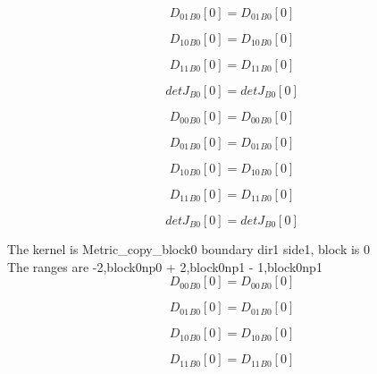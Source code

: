 \documentclass{article}
\begin{document}
\begin{dmath}{D_{01}{_{B0}}}[{0}] = {D_{01}{_{B0}}}[{0}]\end{dmath}

\begin{dmath}{D_{10}{_{B0}}}[{0}] = {D_{10}{_{B0}}}[{0}]\end{dmath}

\begin{dmath}{D_{11}{_{B0}}}[{0}] = {D_{11}{_{B0}}}[{0}]\end{dmath}

\begin{dmath}{detJ{_{B0}}}[{0}] = {detJ{_{B0}}}[{0}]\end{dmath}

\begin{dmath}{D_{00}{_{B0}}}[{0}] = {D_{00}{_{B0}}}[{0}]\end{dmath}

\begin{dmath}{D_{01}{_{B0}}}[{0}] = {D_{01}{_{B0}}}[{0}]\end{dmath}

\begin{dmath}{D_{10}{_{B0}}}[{0}] = {D_{10}{_{B0}}}[{0}]\end{dmath}

\begin{dmath}{D_{11}{_{B0}}}[{0}] = {D_{11}{_{B0}}}[{0}]\end{dmath}

\begin{dmath}{detJ{_{B0}}}[{0}] = {detJ{_{B0}}}[{0}]\end{dmath}

\noindent The kernel is Metric_copy_block0 boundary dir1 side1, block is 0\\\noindent The ranges are -2,block0np0 + 2,block0np1 - 1,block0np1\\\begin{dmath}{D_{00}{_{B0}}}[{0}] = {D_{00}{_{B0}}}[{0}]\end{dmath}

\begin{dmath}{D_{01}{_{B0}}}[{0}] = {D_{01}{_{B0}}}[{0}]\end{dmath}

\begin{dmath}{D_{10}{_{B0}}}[{0}] = {D_{10}{_{B0}}}[{0}]\end{dmath}

\begin{dmath}{D_{11}{_{B0}}}[{0}] = {D_{11}{_{B0}}}[{0}]\end{dmath}
\end{document}
